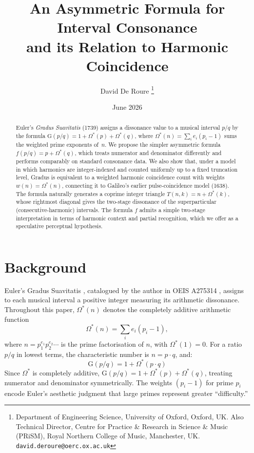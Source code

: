 \documentclass[11pt,a4paper]{article}
\title{An Asymmetric Formula for Interval Consonance \\ and its Relation to Harmonic Coincidence}
\author{David De Roure%
  \thanks{Department of Engineering Science, University of Oxford, Oxford, UK.
  Also Technical Director, Centre for Practice \& Research in Science \&
  Music (PRiSM), Royal Northern College of Music, Manchester, UK.
  \texttt{david.deroure@oerc.ox.ac.uk}}}
\date{June 2026}
\newcommand{\Os}{\Omega^{\!*}}
\newcommand{\G}{\mathrm{G}}
\begin{document}
\maketitle


\begin{abstract}
Euler's \emph{Gradus Suavitatis} (1739) assigns a dissonance value to a musical
interval $p/q$ by the formula $\G(p/q) = 1 + \Os(p) + \Os(q)$, where
$\Os(n) = \sum_i e_i(p_i - 1)$ sums the weighted prime exponents of~$n$.
We propose the simpler asymmetric formula $f(p/q) = p + \Os(q)$, which
treats numerator and denominator differently and performs comparably on
standard consonance data.
We also show that, under a model in which harmonics are integer-indexed and
counted uniformly up to a fixed truncation level, Gradus is equivalent to a
weighted harmonic coincidence count with weights $w(n) = \Os(n)$,
connecting it to Galileo's earlier pulse-coincidence model (1638).
The formula naturally generates a coprime integer triangle $T(n,k) = n + \Os(k)$,
whose rightmost diagonal gives the two-stage dissonance of the superparticular
(consecutive-harmonic) intervals.
The formula $f$ admits a simple two-stage interpretation in terms of
harmonic context and partial recognition, which we offer as a speculative
perceptual hypothesis.
\end{abstract}


\section{Background}

Euler's Gradus Suavitatis \cite{euler1739}, catalogued by the author in OEIS A275314 \cite{oeis}, assigns to each musical
interval a positive integer measuring its arithmetic dissonance. Throughout
this paper, $\Os(n)$ denotes the completely additive arithmetic function
\[
  \Os(n) = \sum_i e_i(p_i - 1),
\]
where $n = p_1^{e_1} p_2^{e_2} \cdots$ is the prime factorisation of $n$,
with $\Os(1) = 0$. For a ratio $p/q$ in lowest terms, the characteristic
number is $n = p \cdot q$, and:
\[
  \G(p/q) = 1 + \Os(p \cdot q)
\]
Since $\Os$ is completely additive, $\G(p/q) = 1 + \Os(p) + \Os(q)$, treating
numerator and denominator symmetrically. The weights $(p_i - 1)$ for prime
$p_i$ encode Euler's aesthetic judgment that large primes represent greater
``difficulty.''
\end{document}
